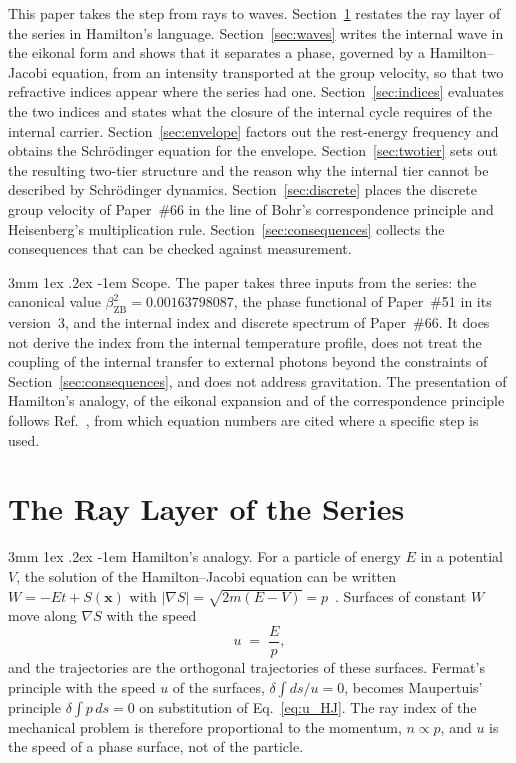 \documentclass[%
 reprint, amsmath,amssymb, aps, prb, ]{revtex4-2}
\makeatletter
\numberwithin{equation}{section}
\renewcommand\paragraph{%
  \@startsection{paragraph}{4}{\z@}%
    {3mm \@plus 1ex \@minus .2ex}%
    {-1em}%
    {\normalfont\normalsize\itshape}}
\newcommand{\bZB}{\beta_{\mathrm{ZB}}}
\makeatother
\begin{document}
This paper takes the step from rays to waves. Section~\ref{sec:rays} restates the ray layer of the series in Hamilton's language. Section~\ref{sec:waves} writes the internal wave in the eikonal form and shows that it separates a phase, governed by a Hamilton--Jacobi equation, from an intensity transported at the group velocity, so that two refractive indices appear where the series had one. Section~\ref{sec:indices} evaluates the two indices and states what the closure of the internal cycle requires of the internal carrier. Section~\ref{sec:envelope} factors out the rest-energy frequency and obtains the Schr\"odinger equation for the envelope. Section~\ref{sec:twotier} sets out the resulting two-tier structure and the reason why the internal tier cannot be described by Schr\"odinger dynamics. Section~\ref{sec:discrete} places the discrete group velocity of Paper~\#66 in the line of Bohr's correspondence principle and Heisenberg's multiplication rule. Section~\ref{sec:consequences} collects the consequences that can be checked against measurement.

\paragraph{Scope.} The paper takes three inputs from the series: the canonical value $\bZB^2 = 0.00163798087$, the phase functional of Paper~\#51 in its version~3, and the internal index and discrete spectrum of Paper~\#66. It does not derive the index from the internal temperature profile, does not treat the coupling of the internal transfer to external photons beyond the constraints of Section~\ref{sec:consequences}, and does not address gravitation. The presentation of Hamilton's analogy, of the eikonal expansion and of the correspondence principle follows Ref.~\cite{Yukawa1954}, from which equation numbers are cited where a specific step is used.

\section{The Ray Layer of the Series}
\label{sec:rays}

\paragraph{Hamilton's analogy.} For a particle of energy $E$ in a potential $V$, the solution of the Hamilton--Jacobi equation can be written $W = -Et + S(\bm{x})$ with $|\nabla S| = \sqrt{2m(E - V)} = p$~\cite{Yukawa1954}. Surfaces of constant $W$ move along $\nabla S$ with the speed
\begin{equation}
u \;=\; \frac{E}{p},
\label{eq:u_HJ}
\end{equation}
and the trajectories are the orthogonal trajectories of these surfaces. Fermat's principle with the speed $u$ of the surfaces, $\delta\int ds/u = 0$, becomes Maupertuis' principle $\delta\int p\,ds = 0$ on substitution of Eq.~\eqref{eq:u_HJ}. The ray index of the mechanical problem is therefore proportional to the momentum, $n \propto p$, and $u$ is the speed of a phase surface, not of the particle.
\end{document}
